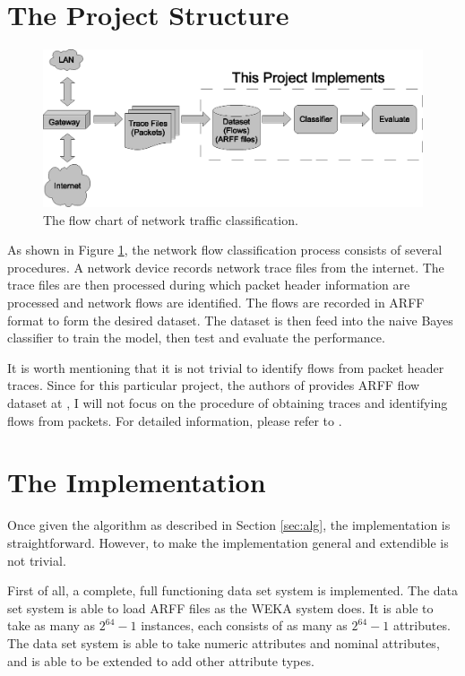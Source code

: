 \documentclass[a4paper,12pt]{article}
\begin{document}
\section{The Project Structure}
\begin{figure}[tbp]
    \centering
    \includegraphics[width=1.1\textwidth]{pic/flow_chart.eps}
    \caption{The flow chart of network traffic classification.}
    \label{fig:flow_chart}
\end{figure} 

As shown in Figure \ref{fig:flow_chart}, the network flow classification process consists of several procedures. A network device records network trace files from the internet. The trace files are then processed during which packet header information are processed and network flows are identified. The flows are recorded in ARFF format to form the desired dataset. The dataset is then feed into the naive Bayes classifier to train the model, then test and evaluate the performance.

It is worth mentioning that it is not trivial to identify flows from packet header traces. Since for this particular project, the authors of \cite{moore2005itc} provides ARFF flow dataset at \cite{moore_website}, I will not focus on the procedure of obtaining traces and identifying flows from packets. For detailed information, please refer to \cite{moore2005duf}.

\section{The Implementation}
\label{sec:imp}
Once given the algorithm as described in Section \ref{sec:alg}, the implementation is straightforward. However, to make the implementation general and extendible is not trivial.

First of all, a complete, full functioning data set system is implemented. The data set system is able to load ARFF files as the WEKA system does. It is able to take as many as $2^{64}-1$ instances, each consists of as many as $2^{64}-1$ attributes. The data set system is able to take numeric attributes and nominal attributes, and is able to be extended to add other attribute types. 
\end{document}
